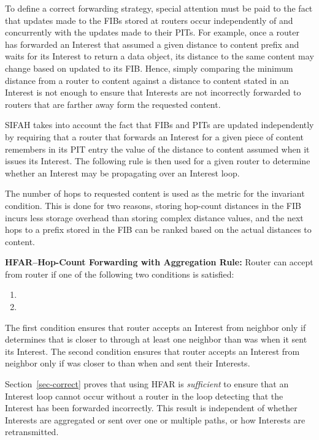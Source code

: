 \documentclass{ancs15-alternate}
\begin{document}
To define  a correct forwarding strategy, special attention must be paid to the fact that updates made to the FIBs stored at routers occur independently of and concurrently with the updates made to their PITs. For example, once a router has forwarded an Interest that assumed a given  distance to content prefix  and waits for its Interest to return a data object,
its distance to the same content may change based on updated to its FIB. Hence, simply comparing the minimum distance from a router to content against a distance to content stated in an Interest is not enough to ensure that Interests are not incorrectly forwarded to routers that are farther away form the requested content.


SIFAH takes into account the fact that FIBs and PITs are updated independently  by requiring that a router that forwards an Interest for a given piece of content remembers in its PIT entry the value of the distance to content  assumed 
when it issues its Interest.  The  following rule is then used for a given router to determine whether  an Interest may be propagating over an Interest loop. 

The number of hops to requested content is used as the  
metric  for the invariant condition. This is done for two reasons, 
storing hop-count distances in the FIB incurs less storage overhead than storing complex distance values, and the next hops to a prefix stored in the FIB can be ranked based on the actual distances to content.

\vspace{0.1in}
{\bf HFAR--Hop-Count  Forwarding with Aggregation Rule:}  Router  can 
accept  from router  if one of the following two conditions 
is satisfied:
\begin{enumerate}
\item
 
\item

\end{enumerate}

The first condition ensures that router  accepts an Interest from neighbor  only if  determines that is closer to  
through at least one neighbor than  was when it sent its Interest.
The second condition ensures that router  accepts an Interest from neighbor  only if  was closer to    than  when  and  sent their Interests. 

Section~\ref{sec-correct} proves that using HFAR is {\em sufficient} to ensure that an Interest loop  cannot occur without a router in the loop detecting that the Interest has been forwarded incorrectly. This result is independent of whether Interests are aggregated or sent over one or multiple paths, or  how Interests are retransmitted.
\end{document}
